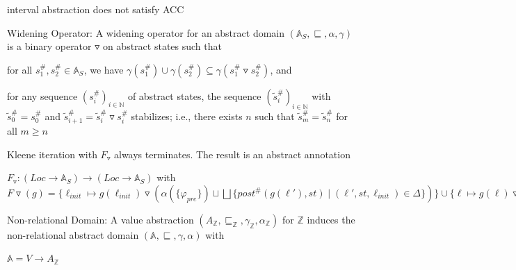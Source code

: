\documentclass[landscape, a4paper]{article}
\begin{document}
\begin{minipage}[t]{0.2\linewidth}
  \begin{betterlist}
		\item {}
		\begin{betterlist}
			\item {}
			\item interval abstraction does not satisfy ACC
			\item \alert{Widening Operator:} A \alert{widening operator} for an abstract domain $(\mathbb{A}_S, \sqsubseteq, \alpha, \gamma)$ is a binary operator $\triangledown$ on abstract states such that
			\begin{betterlist}
				\item for all $s^\#_1, s^\#_2 \in \mathbb{A}_S$, we have $\gamma(s^\#_1) \cup \gamma(s^\#_2) \subseteq \gamma(s^\#_1 \triangledown s^\#_2)$, and
				\item for any sequence $(s^\#_i)_{i\in \mathbb{N}}$ of abstract states, the sequence $(\tilde s^\#_i)_{i\in \mathbb{N}}$ with $\tilde s^\#_0 = s^\#_0$ and $\tilde s^\#_{i+1} = \tilde s^\#_i \triangledown s^\#_i$ stabilizes; i.e., there exists $n$ such that $\tilde s^\#_m = \tilde s^\#_n$ for all $m \ge n$
			\end{betterlist}
			\item Kleene iteration with $F_{\triangledown}$ always terminates. The result is an abstract annotation
			\begin{betterlist}
				\item $F_{\triangledown}: (Loc \rightarrow \mathbb{A}_S) \rightarrow (Loc \rightarrow \mathbb{A}_S)$ with $F\triangledown(g) = \{\ell_{init} \mapsto g(\ell_{init}) \triangledown(\alpha(\{\varphi_{pre}\}) \sqcup \bigsqcup \{post^\#(g(\ell'), st) \mid (\ell', st, \ell_{init}) \in \Delta\})\}\cup \{\ell\mapsto g(\ell) \triangledown \bigsqcup\{post^\#(g(\ell'), st) \mid (\ell', st, \ell) \in \Delta\} \mid \ell \in Loc \setminus \{\ell_{init}\}\}$
			\end{betterlist}
		\end{betterlist}
		\item \alert{Non-relational Domain:} A value abstraction $(A_{\mathbb{Z}}, \sqsubseteq_{\mathbb{Z}}, \gamma_{\mathbb{Z}}, \alpha_{\mathbb{Z}})$ for $\mathbb{Z}$ induces the \alert{non-relational abstract domain} $(\mathbb{A}, \sqsubseteq, \gamma, \alpha)$ with
		\begin{betterlist}
			\item $\mathbb{A} = V \rightarrow A_{\mathbb{Z}}$

\end{betterlist}
\end{betterlist}
\end{minipage}
\end{document}
